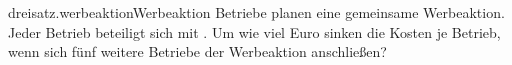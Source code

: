 \begin{exercise}{dreisatz.werbeaktion}{Werbeaktion}
  \ifproblem{} Betriebe planen eine gemeinsame Werbeaktion. Jeder Betrieb beteiligt sich
    mit . Um wie viel Euro sinken die Kosten je Betrieb, wenn
    sich fünf weitere Betriebe der Werbeaktion anschließen?
  \fi
\end{exercise}

